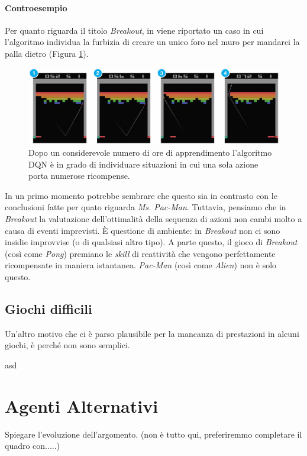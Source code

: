 \documentclass[twoside,twocolumn,10pt]{extarticle}
\theoremstyle{definition}
\begin{document}
		\paragraph*{Controesempio} Per quanto riguarda il titolo \textit{Breakout}, in \cite{bib:dqn} viene riportato un caso in cui l'algoritmo individua la furbizia di creare un unico foro nel muro per mandarci la palla dietro (Figura \ref{fig:breakout}).		
		\begin{figure}[h]
			\centering
			\includegraphics[scale=.65]{images/breakout.png}
			\caption{Dopo un considerevole numero di ore di apprendimento l'algoritmo DQN è in grado di individuare situazioni in cui una sola azione porta numerose ricompense.}
			\label{fig:breakout}
		\end{figure} 
		In un primo momento potrebbe sembrare che questo sia in contrasto con le conclusioni fatte per quato riguarda \textit{Ms. Pac-Man}. Tuttavia, pensiamo che in \textit{Breakout} la valutazione dell'ottimalità della sequenza di azioni non cambi molto a causa di eventi imprevisti. È questione di ambiente: in \textit{Breakout} non ci sono insidie improvvise (o di qualsiasi altro tipo). A parte questo, il gioco di \textit{Breakout} (così come \textit{Pong}) premiano le \textit{skill} di reattività che vengono perfettamente ricompensate in maniera istantanea. \textit{Pac-Man} (così come \textit{Alien}) non è solo questo.
	
	\subsection{Giochi difficili}
		Un'altro motivo che ci è parso plausibile per la mancanza di prestazioni in alcuni giochi, è perché non sono semplici.
	
	
	
	\begin{table}[h]
		\centering
		\caption{asd}
		
		\label{tab:gerarchia}
	\end{table}		
		
\section{Agenti Alternativi}\label{}
	Spiegare l'evoluzione dell'argomento. (non è tutto qui, preferiremmo completare il quadro con.....)
	
\end{document}
